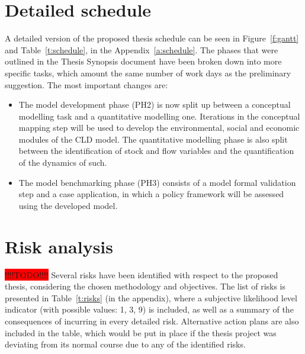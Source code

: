 \documentclass[a4paper,fontsize=10pt,bibliography=totoc]{scrartcl}
\newcommand{\fref}[1]{Figure~\ref{#1}}
\newcommand{\tref}[1]{Table~\ref{#1}}
\newcommand{\aref}[1]{Appendix~\ref{#1}}
\begin{document}
\begin{multicols}{2}
\section{Detailed schedule}
A detailed version of the proposed thesis schedule can be seen in \fref{f:gantt} and \tref{t:schedule}, in the \aref{a:schedule}. The phases that were outlined in the Thesis Synopsis document have been broken down into more specific tasks, which amount the same number of work days as the preliminary suggestion. The most important changes are:
%
\begin{itemize}
\item The model development phase (PH2) is now split up between a conceptual modelling task and a quantitative modelling one. Iterations in the conceptual mapping step will be used to develop the environmental, social and economic modules of the CLD model. The quantitative modelling phase is also split between the identification of stock and flow variables and the quantification of the dynamics of such.
\item The model benchmarking phase (PH3) consists of a model formal validation step and a case application, in which a policy framework will be assessed using the developed model.
\end{itemize}

\section{Risk analysis}
\colorbox{red}{!!!!TODO!!!!}
Several risks have been identified with respect to the proposed thesis, considering the chosen methodology and objectives. The list of risks is presented in \tref{t:risks} (in the  appendix), where a subjective likelihood level indicator (with possible values: 1, 3, 9) is included, as well as a summary of the consequences of incurring in every detailed risk. Alternative action plans are also included in the table, which would be put in place if the thesis project was deviating from its normal course due to any of the identified risks.

\printbibliography
\end{multicols}
\end{document}
